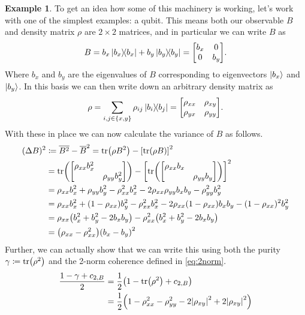 \documentclass[11pt]{article}
\theoremstyle{definition}
\newtheorem{example}{Example}[section]
\newcommand{\twonormE}[1][\rho]{c_{2,B}}
\begin{document}
\begin{example}\label{ex:qubits}
	To get an idea how some of this machinery is working, let's work with one of the simplest examples: a qubit. This means both our observable $B$ and density matrix $\rho$ are $2\times 2$ matrices, and in particular we can write $B$ as
	\begin{equation*}
		B = b_x\ketbra{b_x} + b_y\ketbra{b_y} = \mqty[b_x & 0 \\ 0 & b_y].
	\end{equation*}
	Where $b_x$ and $b_y$ are the eigenvalues of $B$ corresponding to eigenvectors $\ket{b_x}$ and $\ket{b_y}$. In this basis we can then write down an arbitrary density matrix as
	\begin{equation*}
		\rho = \sum_{i, j\in\{x, y\}}\rho_{ij}\ketbra{b_i}{b_j} = \mqty[\rho_{xx} & \rho_{xy} \\ \rho_{yx} & \rho_{yy}].
	\end{equation*}
	With these in place we can now calculate the variance of $B$ as follows.
	\begin{align*}
		(\Delta B)^2 & \coloneqq \overline{B^2} - \overline{B}^2 = \tr(\rho B^2) - \qty[\tr(\rho B)]^2                                        \\
		             & = \tr(\mqty[\dmat{\rho_{xx}b_x^2, \rho_{yy}b_y^2}]) - \qty[\tr(\mqty[\dmat{\rho_{xx}b_x, \rho_{yy}b_y}])]^2            \\
		             & = \rho_{xx}b_x^2 + \rho_{yy}b_y^2 - \rho_{xx}^2b_x^2 - 2\rho_{xx}\rho_{yy}b_x b_y - \rho_{yy}^2b_y^2                   \\
		             & = \rho_{xx}b_x^2 + (1 - \rho_{xx})b_y^2 - \rho_{xx}^2b_x^2 - 2\rho_{xx}(1 - \rho_{xx})b_x b_y - (1 - \rho_{xx})^2b_y^2 \\
		             & = \rho_{xx}\qty(b_x^2 + b_y^2 - 2b_x b_y) - \rho_{xx}^2\qty(b_x^2 + b_y^2 - 2b_x b_y)                                  \\
		             & = \qty(\rho_{xx} - \rho_{xx}^2)\qty(b_x - b_y)^2
	\end{align*}
	Further, we can actually show that we can write this using both the purity $\gamma\coloneqq\tr(\rho^2)$ and the 2-norm coherence defined in \cref{eq:2norm}.
	\begin{align*}
		\frac{1 - \gamma + \twonormE}{2} & = \frac{1}{2}\qty(1 - \tr(\rho^2) + \twonormE)                                             \\
		                                 & = \frac{1}{2}\qty(1 - \rho_{xx}^2 - \rho_{yy}^2 - 2\abs{\rho_{xy}}^2 + 2\abs{\rho_{xy}}^2) \\

\end{align*}
\end{example}
\end{document}
